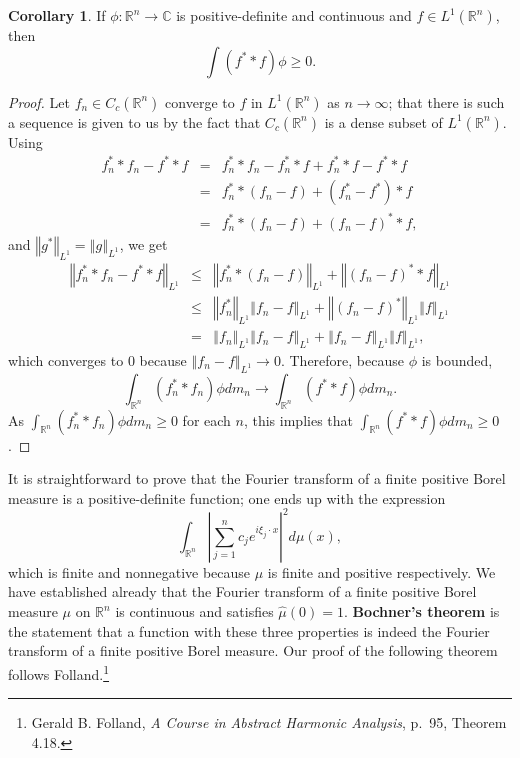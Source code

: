 \documentclass{article}
\newcommand{\norm}[1]{\left\Vert #1 \right\Vert}
\theoremstyle{definition}
\newtheorem{corollary}[theorem]{Corollary}
\theoremstyle{definition}
\begin{document}
\begin{corollary}
If $\phi:\mathbb{R}^n \to \mathbb{C}$ is positive-definite and continuous and $f \in L^1(\mathbb{R}^n)$, then
\[
\int (f^* * f) \phi \geq 0.
\]
\label{positivecor}
\end{corollary}
\begin{proof}
Let $f_n \in C_c(\mathbb{R}^n)$ converge to $f$ in $L^1(\mathbb{R}^n)$ as $n \to \infty$; that there is such a sequence is
given to us by the fact that $C_c(\mathbb{R}^n)$ is a dense subset of $L^1(\mathbb{R}^n)$. 
Using
\begin{eqnarray*}
f_n^* * f_n- f^* * f &=& f_n^* * f_n - f_n^** f + f_n^* *f - f^* * f\\
&=&f_n^**(f_n-f)+(f_n^*-f^*)*f\\
&=&f_n^**(f_n-f)+(f_n-f)^**f,
\end{eqnarray*}
and $\norm{g^*}_{L^1}=\norm{g}_{L^1}$,
we get
\begin{eqnarray*}
\norm{f_n^* * f_n - f^* * f}_{L^1}&\leq&\norm{f_n^**(f_n-f)}_{L^1}+\norm{(f_n-f)^**f}_{L^1}\\
&\leq&\norm{f_n^*}_{L^1} \norm{f_n-f}_{L^1} + \norm{(f_n-f)^*}_{L^1} \norm{f}_{L^1}\\
&=&\norm{f_n}_{L^1} \norm{f_n-f}_{L^1} + \norm{f_n-f}_{L^1} \norm{f}_{L^1},
\end{eqnarray*}
which converges to $0$ because $\norm{f_n-f}_{L^1} \to 0$. Therefore, because $\phi$ is bounded,
\[
\int_{\mathbb{R}^n} (f_n^* * f_n) \phi dm_n \to \int_{\mathbb{R}^n} (f^* * f)\phi dm_n.
\]
As $\int_{\mathbb{R}^n} (f_n^* * f_n)\phi dm_n \geq 0$ for each $n$, this implies that $\int_{\mathbb{R}^n} (f^* * f)\phi dm_n \geq 0$.
\end{proof}



It is straightforward to prove that the Fourier transform of a finite positive Borel measure is a positive-definite function; one ends up with the expression
\[
\int_{\mathbb{R}^n} \left| \sum_{j=1}^n c_j e^{i\xi_j\cdot x} \right|^2 d\mu(x),
\]
which is finite and nonnegative because $\mu$ is finite and positive respectively. We have established already that the
Fourier transform of a finite positive Borel measure $\mu$ on $\mathbb{R}^n$ is continuous and satisfies $\hat{\mu}(0)=1$. \textbf{Bochner's theorem}
is the statement that a function with these three properties is indeed the Fourier transform of a finite positive Borel measure.
Our proof of the following theorem follows Folland.\footnote{Gerald B. Folland, {\em A Course in Abstract Harmonic Analysis}, p.~95, Theorem 4.18.}
\end{document}
